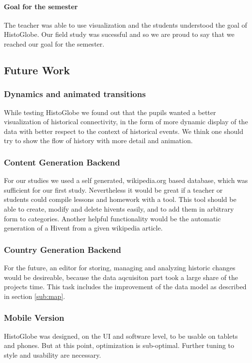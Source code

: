 \paragraph{Goal for the semester} %
The teacher was able to use visualization and the students understood the goal of HistoGlobe. Our field study was sucessful and so we are proud to say that we reached our goal for the semester.

\subsection{Future Work} %
\label{sub:future_work}

\subsubsection{Dynamics and animated transitions} %
\label{sub:dynamics_and_animated_transitions}
While testing HistoGlobe we found out that the pupils wanted a better visualization of historical connectivity, in the form of  more dynamic display of the data with better respect to the context of historical events. We think one should try to show the flow of history with more detail and animation.



\subsubsection{Content Generation Backend} %
\label{sub:content_generation_backend}

For our studies we used a self generated, wikipedia.org based database, which was sufficient for our first study. Nevertheless it would be great if a teacher or students could compile lessons and homework with a tool. This tool should be able to create, modify and delete hivents easily, and to add them in arbitrary form to categories.
Another helpful functionality would be the automatic generation of a Hivent from a given wikipedia article.

\subsubsection{Country Generation Backend} %
\label{sub:country_generation_backend}
For the future, an editor for storing, managing and analyzing historic changes would be desireable, because the data aqcuisiton part took a large share of the projects time. This task includes the improvement of the data model as described in section \ref{sub:map}.

\subsubsection{Mobile Version} %
\label{sub:mobile_version}
HistoGlobe was designed, on the UI and software level, to be usable on tablets and phones. But at this point, optimization is sub-optimal.
Further tuning to style and usability are necessary.

